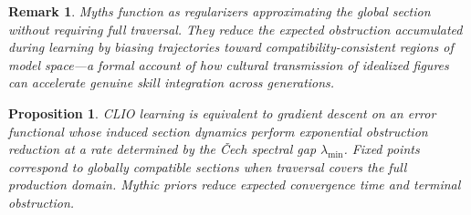 \documentclass[12pt]{article}
\newtheorem{proposition}{Proposition}
\newtheorem{remark}{Remark}
\begin{document}
\begin{remark}
Myths function as regularizers approximating the global section without requiring full traversal. They reduce the expected obstruction accumulated during learning by biasing trajectories toward compatibility-consistent regions of model space---a formal account of how cultural transmission of idealized figures can accelerate genuine skill integration across generations.
\end{remark}

\begin{proposition}
CLIO learning is equivalent to gradient descent on an error functional whose induced section dynamics perform exponential obstruction reduction at a rate determined by the \v{C}ech spectral gap $\lambda_{\min}$. Fixed points correspond to globally compatible sections when traversal covers the full production domain. Mythic priors reduce expected convergence time and terminal obstruction.
\end{proposition}
\end{document}
